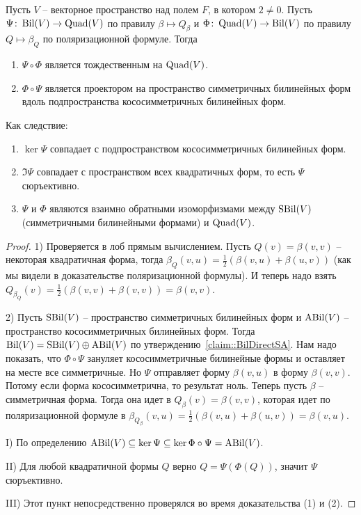 \begin{claim}
\label{claim::SBilQuad}
Пусть $V$ -- векторное пространство над полем $F$, в котором $2 \neq 0$.
Пусть $\Psi\colon \operatorname{Bil}(V) \to \operatorname{Quad}(V)$ по правилу $\beta\mapsto Q_\beta$ и $\Phi\colon \operatorname{Quad}(V)\to \operatorname{Bil}(V)$ по правилу $Q \mapsto \beta_Q$ по поляризационной формуле.
Тогда
\begin{enumerate}
\item $\Psi\circ \Phi$ является тождественным на $\operatorname{Quad}(V)$.

\item $\Phi\circ \Psi$ является проектором на пространство симметричных билинейных форм вдоль подпространства кососимметричных билинейных форм.
\end{enumerate}

Как следствие:
\begin{enumerate}
[\rm I.]
\item $\ker \Psi$ совпадает с подпространством кососимметричных билинейных форм.

\item $\Im \Psi$ совпадает с пространством всех квадратичных форм, то есть $\Psi$ сюръективно.

\item $\Psi$ и $\Phi$ являются взаимно обратными изоморфизмами между $\operatorname{SBil}(V)$ (симметричными билинейными формами) и $\operatorname{Quad}(V)$.
\end{enumerate}
\end{claim}
\begin{proof}
1) Проверяется в лоб прямым вычислением.
Пусть $Q(v) = \beta(v,v)$ -- некоторая квадратичная форма, тогда $\beta_Q(v,u) = \frac{1}{2}(\beta(v,u) + \beta(u,v))$ (как мы видели в доказательстве поляризационной формулы).
И теперь надо взять $Q_{\beta_Q}(v) =  \frac{1}{2}(\beta(v,v) + \beta(v,v)) = \beta(v,v)$.

2) Пусть $\operatorname{SBil}(V)$ -- пространство симметричных билинейных форм и $\operatorname{ABil}(V)$ -- пространство кососимметричных билинейных форм.
Тогда $\operatorname{Bil}(V) = \operatorname{SBil}(V) \oplus \operatorname{ABil}(V)$ по утверждению~\ref{claim::BilDirectSA}.
Нам надо показать, что $\Phi\circ \Psi$ зануляет кососимметричные билинейные формы и оставляет на месте все симметричные.
Но $\Psi$ отправляет форму $\beta(v, u)$ в форму $\beta(v,v)$.
Потому если форма кососимметрична, то результат ноль.
Теперь пусть $\beta$ -- симметричная форма.
Тогда она идет в $Q_\beta(v) = \beta(v,v)$, которая идет по поляризационной формуле в $\beta_{Q_\beta}(v, u)= \frac{1}{2}(\beta(v,u) + \beta(u,v)) = \beta(v,u)$.

I) По определению $\operatorname{ABil}(V) \subseteq \ker \Psi \subseteq \ker \Phi\circ \Psi = \operatorname{ABil}(V)$.

II) Для любой квадратичной формы $Q$ верно $Q = \Psi(\Phi(Q))$, значит $\Psi$ сюръективно.

III) Этот пункт непосредственно проверялся во время доказательства (1) и (2).

\end{proof}

